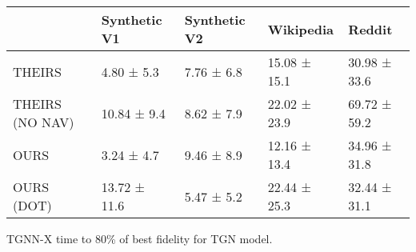 \begin{tabular}{lllll}
\toprule
 & Synthetic V1 & Synthetic V2 & Wikipedia & Reddit \\
\midrule
THEIRS & 4.80 ± 5.3 & 7.76 ± 6.8 & 15.08 ± 15.1 & 30.98 ± 33.6 \\
THEIRS (NO NAV) & 10.84 ± 9.4 & 8.62 ± 7.9 & 22.02 ± 23.9 & 69.72 ± 59.2 \\
OURS & 3.24 ± 4.7 & 9.46 ± 8.9 & 12.16 ± 13.4 & 34.96 ± 31.8 \\
OURS (DOT) & 13.72 ± 11.6 & 5.47 ± 5.2 & 22.44 ± 25.3 & 32.44 ± 31.1 \\
\bottomrule
\end{tabular}
\caption{\label{tab:tgn_time}TGNN-X time to 80\% of best fidelity for TGN model.}


